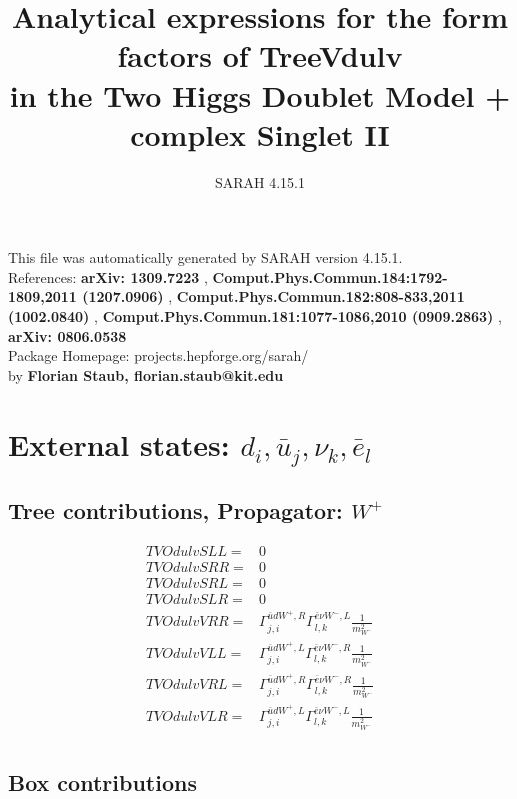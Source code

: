\documentclass[A4,landscape]{article}
\begin{document}
\title{Analytical expressions for the form factors of TreeVdulv\\ in the Two Higgs Doublet Model + complex Singlet II } 
 \author{SARAH 4.15.1} 
 \maketitle 
 \vspace{10cm} 
This file was automatically generated by SARAH version 4.15.1.  \\ 
References: {\bf arXiv: 1309.7223 }, {\bf Comput.Phys.Commun.184:1792-1809,2011 (1207.0906) }, {\bf Comput.Phys.Commun.182:808-833,2011 (1002.0840) }, {\bf Comput.Phys.Commun.181:1077-1086,2010 (0909.2863) }, {\bf arXiv: 0806.0538 } \\ 
Package Homepage: projects.hepforge.org/sarah/ \\ 
by {\bf Florian Staub, florian.staub@kit.edu} 
 \pagebreak 
 \tableofcontents 
 \pagebreak 
\section{External states: ${d_{{i}}, \bar{u}_{{j}}, \nu_{{k}}, \bar{e}_{{l}}}$} 
\subsection{Tree contributions, Propagator: $W^+$} 

\begin{align} 
  TVOdulvSLL= & 0 \\ 
  TVOdulvSRR= & 0 \\ 
  TVOdulvSRL= & 0 \\ 
  TVOdulvSLR= & 0 \\ 
  TVOdulvVRR= & \Gamma^{\bar{u}d W^+,R}_{j, i} \Gamma^{\bar{e}\nu W^- ,L}_{l, k} \frac{1}{m^2_{W^-}} \\ 
  TVOdulvVLL= & \Gamma^{\bar{u}d W^+,L}_{j, i} \Gamma^{\bar{e}\nu W^- ,R}_{l, k} \frac{1}{m^2_{W^-}} \\ 
  TVOdulvVRL= & \Gamma^{\bar{u}d W^+,R}_{j, i} \Gamma^{\bar{e}\nu W^- ,R}_{l, k} \frac{1}{m^2_{W^-}} \\ 
  TVOdulvVLR= & \Gamma^{\bar{u}d W^+,L}_{j, i} \Gamma^{\bar{e}\nu W^- ,L}_{l, k} \frac{1}{m^2_{W^-}} \\ 
\end{align} 
\subsection{Box contributions} 
\end{document}
